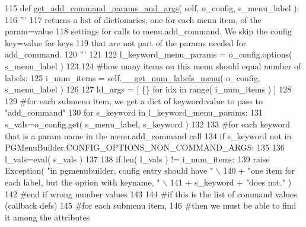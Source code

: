 \begin{DoxyCode}
115     \textcolor{keyword}{def }\hyperlink{classgui__frontend__popgen__program_1_1pgmenubuilder_1_1PGMenuBuilder_a717ed3e9feead39c81f11bf47a2d0cf4}{get\_add\_command\_params\_and\_args}( self,  o\_config, s\_menu\_label ):
116         \textcolor{stringliteral}{'''}
117 \textcolor{stringliteral}{        returns a list of dictionaries, one for each menu item, of the param=value}
118 \textcolor{stringliteral}{        settings for calls to menu.add\_command.  We skip the config key=value for keys}
119 \textcolor{stringliteral}{        that are not part of the params needed for add\_command. }
120 \textcolor{stringliteral}{        '''}
121 
122         l\_keyword\_menu\_params = o\_config.options( s\_menu\_label )    
123 
124         \textcolor{comment}{#how many items on this menu should equal number of labels:}
125         i\_num\_items = self.\hyperlink{classgui__frontend__popgen__program_1_1pgmenubuilder_1_1PGMenuBuilder_a40e63e390562a2a3eecacef8a72ddbef}{\_\_get\_num\_labels\_menu}( o\_config, s\_menu\_label )
126 
127         ld\_args = [ \{\} \textcolor{keywordflow}{for} idx \textcolor{keywordflow}{in} range( i\_num\_items ) ]
128 
129         \textcolor{comment}{#for each submenu item, we get a dict of keyword:value to pass to "add\_command"}
130         \textcolor{keywordflow}{for} s\_keyword \textcolor{keywordflow}{in} l\_keyword\_menu\_params:
131             s\_vals=o\_config.get( s\_menu\_label, s\_keyword )
132 
133             \textcolor{comment}{#for each keyword that is a param name in the menu.add\_command call}
134             \textcolor{keywordflow}{if} s\_keyword \textcolor{keywordflow}{not} \textcolor{keywordflow}{in} PGMenuBuilder.CONFIG\_OPTIONS\_NON\_COMMAND\_ARGS:
135 
136                 l\_vals=eval( s\_vals )
137 
138                 \textcolor{keywordflow}{if} len( l\_vals ) != i\_num\_items:
139                     \textcolor{keywordflow}{raise} Exception( \textcolor{stringliteral}{"in pgmenubuilder, config entry should have "} \(\backslash\)
140                             + \textcolor{stringliteral}{"one item for each label, but the option with keyname, "} \(\backslash\)
141                             + s\_keyword + \textcolor{stringliteral}{"does not."} )
142                 \textcolor{comment}{#end if wrong number values}
143                 
144                 \textcolor{comment}{#if this is the list of command values (callback defs) }
145                 \textcolor{comment}{#for each submenu item,}
146                 \textcolor{comment}{#then we must be able to find it among the attributes}

\end{DoxyCode}
